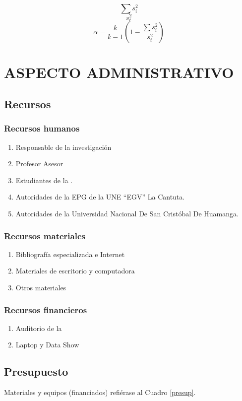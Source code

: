 \documentclass[12pt,a4paper]{article}
\begin{document}
$$\sum s_i^2$$
$$s_t^2$$
$$\alpha=\frac{k}{k-1}\left(1-\frac{\sum s_i^2}{s_t^2}\right)$$


\section{ASPECTO  ADMINISTRATIVO}
\subsection{Recursos}

\subsubsection{Recursos humanos}
\begin{enumerate}
  \item Responsable de la investigación
  \item Profesor Asesor
  \item Estudiantes de la \lugar.
  \item Autoridades de la EPG de la UNE “EGV” La Cantuta.
  \item Autoridades de la Universidad Nacional De San Cristóbal De Huamanga.
\end{enumerate}

\subsubsection{Recursos materiales}
\begin{enumerate}
\item Bibliografía especializada e Internet %
\item Materiales de escritorio y computadora %
\item Otros materiales %
\end{enumerate}

\subsubsection{Recursos financieros}
\begin{enumerate}
\item Auditorio de la \lugar
\item Laptop y Data Show
\end{enumerate}

\subsection{Presupuesto}
Materiales y equipos (financiados) refiérase al Cuadro \ref{presup}.
\end{document}
